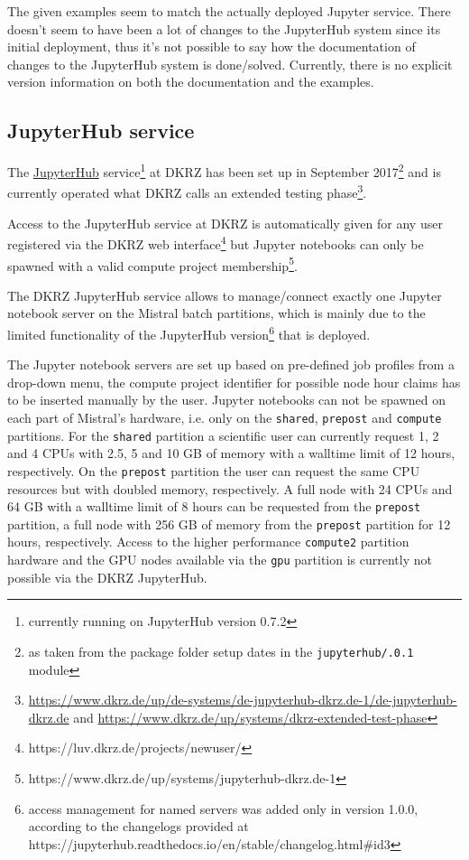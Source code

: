 The given examples seem to match the actually deployed Jupyter service.
There doesn't seem to have been a lot of changes to the JupyterHub system since its initial deployment, thus it's not possible to say how the documentation of changes to the JupyterHub system is done/solved.
Currently, there is no explicit version information on both the documentation and the examples.

\subsection{JupyterHub service}

The \href{https://jupyterhub.dkrz.de/}{JupyterHub} service\footnote{currently running on JupyterHub version 0.7.2} at DKRZ has been set up in September 2017\footnote{as taken from the package folder setup dates in the \verb|jupyterhub/.0.1| module} and is currently operated what DKRZ calls an extended testing phase\footnote{\url{https://www.dkrz.de/up/de-systems/de-jupyterhub-dkrz.de-1/de-jupyterhub-dkrz.de} and \url{https://www.dkrz.de/up/systems/dkrz-extended-test-phase}}.

Access to the JupyterHub service at DKRZ is automatically given for any user registered via the DKRZ web interface\footnote{https://luv.dkrz.de/projects/newuser/} but Jupyter notebooks can only be spawned with a valid compute project membership\footnote{https://www.dkrz.de/up/systems/jupyterhub-dkrz.de-1}.

The DKRZ JupyterHub service allows to manage/connect exactly one Jupyter notebook server on the Mistral batch partitions, which is mainly due to the limited functionality of the JupyterHub version\footnote{access management for named servers was added only in version 1.0.0, according to the changelogs provided at https://jupyterhub.readthedocs.io/en/stable/changelog.html#id3} that is deployed.

The Jupyter notebook servers are set up based on pre-defined job profiles from a drop-down menu, the compute project identifier for possible node hour claims has to be inserted manually by the user.
Jupyter notebooks can not be spawned on each part of Mistral's hardware, i.e. only on the \verb|shared|, \verb|prepost| and \verb|compute| partitions.
For the \verb|shared| partition a scientific user can currently request 1, 2 and 4 CPUs with 2.5, 5 and 10 GB of memory with a walltime limit of 12 hours, respectively.
On the \verb|prepost| partition the user can request the same CPU resources but with doubled memory, respectively.
A full node with 24 CPUs and 64 GB with a walltime limit of 8 hours can be requested from the \verb|prepost| partition, a full node with 256 GB of memory from the \verb|prepost| partition for 12 hours, respectively.
Access to the higher performance \verb|compute2| partition hardware and the GPU nodes available via the \verb|gpu| partition is currently not possible via the DKRZ JupyterHub.

